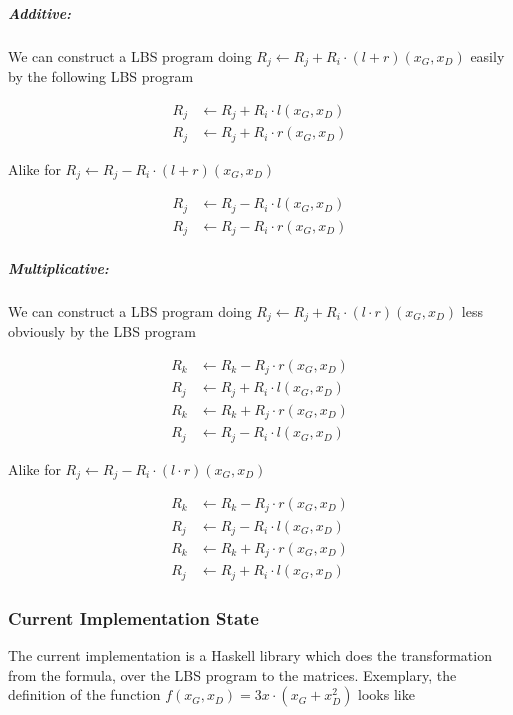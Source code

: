 \documentclass[12pt, a4paper]{article}
\begin{document}
\subparagraph{Additive:} We can construct a LBS program doing $R_j \leftarrow
R_j + R_i \cdot (l + r)(x_G, x_D)$ easily by the following LBS program

\begin{align*}
R_j & \leftarrow R_j + R_i \cdot l(x_G, x_D) \\
R_j & \leftarrow R_j + R_i \cdot r(x_G, x_D)
\end{align*}

Alike for $R_j \leftarrow R_j - R_i \cdot (l + r)(x_G, x_D)$

\begin{align*}
R_j & \leftarrow R_j - R_i \cdot l(x_G, x_D) \\
R_j & \leftarrow R_j - R_i \cdot r(x_G, x_D)
\end{align*}


\subparagraph{Multiplicative:} We can construct a LBS program doing $R_j
\leftarrow R_j + R_i \cdot (l \cdot r)(x_G, x_D)$ less obviously by the LBS
program

\begin{align*}
R_k & \leftarrow R_k - R_j \cdot r(x_G, x_D) \\
R_j & \leftarrow R_j + R_i \cdot l(x_G, x_D) \\
R_k & \leftarrow R_k + R_j \cdot r(x_G, x_D) \\
R_j & \leftarrow R_j - R_i \cdot l(x_G, x_D)
\end{align*}

Alike for $R_j \leftarrow R_j - R_i \cdot (l \cdot r)(x_G, x_D)$

\begin{align*}
R_k & \leftarrow R_k - R_j \cdot r(x_G, x_D) \\
R_j & \leftarrow R_j - R_i \cdot l(x_G, x_D) \\
R_k & \leftarrow R_k + R_j \cdot r(x_G, x_D) \\
R_j & \leftarrow R_j + R_i \cdot l(x_G, x_D)
\end{align*}


\subsubsection{Current Implementation State}

The current implementation is a Haskell library which does the transformation
from the formula, over the LBS program to the matrices. Exemplary,
the definition of the function $f(x_G,x_D) = 3x \cdot (x_G + x_D^2)$ looks like

\lstset{language=Haskell}
\end{document}
